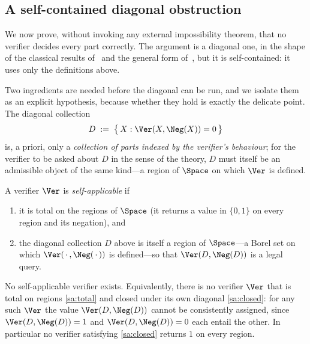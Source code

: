 \subsection{A self-contained diagonal obstruction}

We now prove, without invoking any external impossibility theorem, that no
verifier decides every part correctly. The argument is a diagonal one, in the
shape of the classical results of~\citet{russell1903,cantor1891,tarski1936} and
the general form of~\citet{lawvere1969}, but it is self-contained: it uses only
the definitions above.

Two ingredients are needed before the diagonal can be run, and we isolate them as
an explicit hypothesis, because whether they hold is exactly the delicate point.
The diagonal collection
\[
D\;:=\;\bigl\{\,X : \Ver(X,\Neg(X))=0\,\bigr\}
\]
is, a priori, only a \emph{collection of parts indexed by the verifier's
behaviour}; for the verifier to be asked about $D$ in the sense of the theory, $D$
must itself be an admissible object of the same kind---a region of $\Space$ on
which $\Ver$ is defined.

\begin{definition}
\label{def:self-applicable}
A verifier $\Ver$ is \emph{self-applicable} if
\begin{enumerate}[label=\textup{(SA\arabic*)},leftmargin=3em]
\item\label{sa:total} it is total on the regions of $\Space$ (it returns a value
in $\{0,1\}$ on every region and its negation), and
\item\label{sa:closed} the diagonal collection $D$ above is itself a region of
$\Space$---a Borel set on which $\Ver(\,\cdot\,,\Neg(\,\cdot\,))$ is defined---so
that $\Ver(D,\Neg(D))$ is a legal query.
\end{enumerate}
\end{definition}

\begin{theorem}
\label{thm:diagonal}
No self-applicable verifier exists. Equivalently, there is no verifier $\Ver$
that is total on regions \ref{sa:total} and closed under its own diagonal
\ref{sa:closed}: for any such $\Ver$ the value $\Ver(D,\Neg(D))$ cannot be
consistently assigned, since $\Ver(D,\Neg(D))=1$ and $\Ver(D,\Neg(D))=0$ each
entail the other. In particular no verifier satisfying \ref{sa:closed} returns
$1$ on every region.
\end{theorem}

